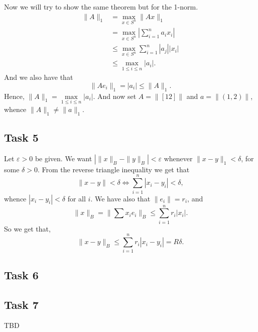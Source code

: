 \documentclass[a4paper,12pt]{article}
\begin{document}
Now we will try to show the same theorem but for the 1-norm.
\begin{align*}
\|A\|_1&=\underset{x\in S^n}{\max} \|Ax\|_1\\
&=\underset{x\in S^n}{\max} \left| \sum_{i=1}^{n}a_i x_i\right|\\
&\le\underset{x\in S^n}{\max} \sum_{i=1}^{n}|a_j||x_i|\\
&\le\underset{1\le i \le n}{\max}|a_i|.
\end{align*}
And we also have that
\begin{equation*}
\|Ae_i\|_1=|a_i|\le \|A\|_1.
\end{equation*}
Hence, $ \|A\|_1=\underset{1\le i \le n}{\max} |a_i|$. And now set $A= \|[1 2]\|$ and $a=\|(1,2)\|$, whence $\|A\|_1\not= \|a\|_1$.
\subsection*{Task 5}
Let $\varepsilon >0$ be given. We want $ \left| \|x\|_B-\|y\|_B\right|<\varepsilon $ whenever $\|x-y\|_1<\delta $, for some $\delta >0$. From the reverse triangle inequality we get that 
\begin{equation*}
\|x-y\|<\delta \Leftrightarrow \sum_{i=1}^{n} |x_i-y_i|<\delta,
\end{equation*}
whence $|x_i-y_i|<\delta$ for all $i$.
We have also that $\|e_i\|=r_i$, and
\begin{equation*}
\|x\|_B=\|\sum x_i e_i\|_B\le \sum_{i=1}^{n} r_i |x_i|.
\end{equation*}
So we get that,
\begin{equation*}
\|x-y\|_B\le \sum_{i=1}^{n} r_i|x_i-y_i|=R\delta.
\end{equation*}
\subsection*{Task 6}


\subsection*{Task 7}

TBD
\end{document}
